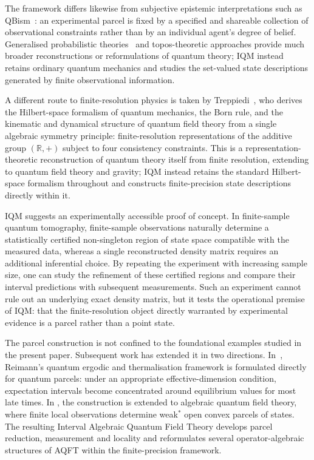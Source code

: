 \documentclass[11pt, onecolumn]{article}
\begin{document}
The framework differs likewise from subjective epistemic interpretations
such as QBism~\cite{fuchs2010,fuchs2014introduction}: an experimental parcel
is fixed by a specified and shareable collection of observational
constraints rather than by an individual agent's degree of belief.
Generalised probabilistic theories~\cite{chiribella2010probabilistic,
Plavala2023} and topos-theoretic approaches
\cite{butterfield1999topos,doring2008topos,heunen2009topos} provide much
broader reconstructions or reformulations of quantum theory; IQM instead
retains ordinary quantum mechanics and studies the set-valued state
descriptions generated by finite observational information.

A different route to finite-resolution physics is taken by
Treppiedi~\cite{Treppiedi2026}, who derives the Hilbert-space formalism of
quantum mechanics, the Born rule, and the kinematic and dynamical structure
of quantum field theory from a single algebraic symmetry principle: finite-resolution
representations of the additive group $(\mathbb R,+)$ subject to four
consistency constraints. This is a representation-theoretic reconstruction
of quantum theory itself from finite resolution, extending to quantum field
theory and gravity; IQM instead retains the standard Hilbert-space formalism
throughout and constructs finite-precision state descriptions directly
within it.


IQM suggests an experimentally accessible proof of concept. In finite-sample
quantum tomography, finite-sample observations naturally determine a
statistically certified non-singleton region of state space compatible with
the measured data, whereas a single reconstructed density matrix requires an
additional inferential choice. By repeating the experiment with increasing
sample size, one can study the refinement of these certified regions and
compare their interval predictions with subsequent measurements. Such an
experiment cannot rule out an underlying exact density matrix, but it tests
the operational premise of IQM: that the finite-resolution object directly
warranted by experimental evidence is a parcel rather than a point state.


The parcel construction is not confined to the foundational examples studied
in the present paper. Subsequent work has extended it in two directions.
In~\cite{EdalatErgodicity2026}, Reimann's quantum ergodic and thermalisation
framework is formulated directly for quantum parcels: under an appropriate
effective-dimension condition, expectation intervals become concentrated
around equilibrium values for most late times. In
\cite{EdalatIAQFT2026}, the construction is extended to algebraic quantum
field theory, where finite local observations determine weak$^*$ open convex
parcels of states. The resulting Interval Algebraic Quantum Field Theory
develops parcel reduction, measurement and locality and reformulates several
operator-algebraic structures of AQFT within the finite-precision framework.
\end{document}
